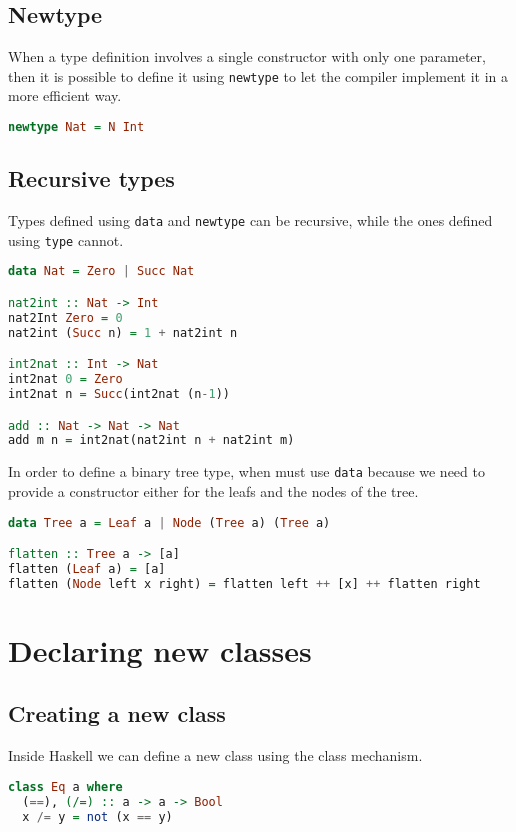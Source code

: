 \subsection{Newtype}
When a type definition involves a single constructor with only one parameter, then it is possible to define it using \texttt{newtype} to let the compiler implement it in a more efficient way. 

\begin{lstlisting}[language=haskell]
newtype Nat = N Int
\end{lstlisting}


\subsection{Recursive types}
Types defined using \texttt{data} and \texttt{newtype} can be recursive, while the ones defined using \texttt{type} cannot.

\begin{lstlisting}[language=haskell]
data Nat = Zero | Succ Nat

nat2int :: Nat -> Int
nat2Int Zero = 0
nat2int (Succ n) = 1 + nat2int n

int2nat :: Int -> Nat
int2nat 0 = Zero
int2nat n = Succ(int2nat (n-1))

add :: Nat -> Nat -> Nat
add m n = int2nat(nat2int n + nat2int m)
\end{lstlisting}

In order to define a binary tree type, when must use \texttt{data} because we need to provide a constructor either for the leafs and the nodes of the tree.

\begin{lstlisting}[language=haskell]
data Tree a = Leaf a | Node (Tree a) (Tree a)

flatten :: Tree a -> [a]
flatten (Leaf a) = [a]
flatten (Node left x right) = flatten left ++ [x] ++ flatten right
\end{lstlisting}


\section{Declaring new classes}
\subsection{Creating a new class}
Inside Haskell we can define a new class using the class mechanism. 

\begin{lstlisting}[language=haskell]
class Eq a where
  (==), (/=) :: a -> a -> Bool
  x /= y = not (x == y)
\end{lstlisting}

